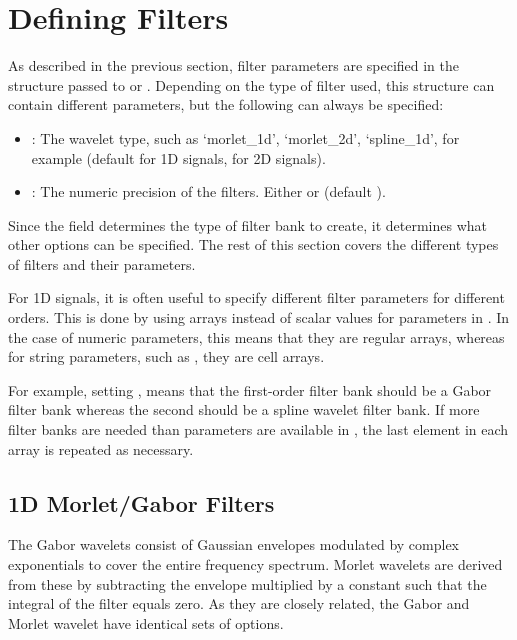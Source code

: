 \documentclass[twocolumn]{article}
\begin{document}
\section{Defining Filters}

As described in the previous section, filter parameters are specified in the  structure passed to  or . Depending on the type of filter used, this structure can contain different parameters, but the following can always be specified:
\begin{itemize}
	\item {}: The wavelet type, such as `morlet\_1d', `morlet\_2d', `spline\_1d', for example (default  for 1D signals,  for 2D signals).
	\item {}: The numeric precision of the filters. Either  or  (default ).
\end{itemize}
Since the  field determines the type of filter bank to create, it determines what other options can be specified. The rest of this section covers the different types of filters and their parameters.

For 1D signals, it is often useful to specify different filter parameters for different orders. This is done by using arrays instead of scalar values for parameters in . In the case of numeric parameters, this means that they are regular arrays, whereas for string parameters, such as , they are cell arrays.

For example, setting , means that the first-order filter bank should be a Gabor filter bank whereas the second should be a spline wavelet filter bank. If more filter banks are needed than parameters are available in , the last element in each array is repeated as necessary.

\subsection{1D Morlet/Gabor Filters}
The Gabor wavelets consist of Gaussian envelopes modulated by complex exponentials to cover the entire frequency spectrum. Morlet wavelets are derived from these by subtracting the envelope multiplied by a constant such that the integral of the filter equals zero. As they are closely related, the Gabor and Morlet wavelet have identical sets of options.
\end{document}
